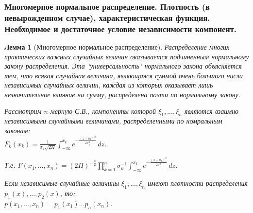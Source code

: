 \documentclass[14pt]{extarticle}
\theoremstyle{breakstyle}
\newtheorem{lemma}{Лемма}[subsection]
\begin{document}
\subsubsection{Многомерное нормальное распределение. Плотность (в невырожденном случае), характеристическая функция. Необходимое и достаточное условие независимости компонент.}
\begin{lemma}[Многомерное нормальное распределение]

Распределение многих практических важных случайных величин оказывается подчиненным нормальному закону распределения. Эта "универсальность" нормального закона объясняется тем, что всякая случайная величина, являющаяся суммой очень большого числа независимых случайных величин, каждая из которых оказывает лишь незначительное влияние на сумму, распределена почти по нормальному закону.

\vspace{\baselineskip}

Рассмотрим $n$-мерную С.В., компоненты которой $\xi_{1}, ..., \xi_{n}$ являются взаимно независимыми случайными величинами, распределенными по номральным законам:\\
$F_{k}(x_{k}) = \frac{1}{\sigma_{k}\sqrt{2\Pi}} \int_{-\infty}^{x_{k}} e^{-\frac{(z-a_{k})^{2}}{2\sigma_{k}^{2}}} \, dz$. 

\vspace{\baselineskip}

Т.е. $F(x_{1}, ..., x_{n}) = (2\Pi)^{-\frac{n}{2}}\prod_{k=1}^{n} \sigma_{k}^{-1} \int_{-\infty}^{x_{k}} e^{-\frac{(z - a_{k})^{2}}{2\sigma_{k}^2}} \, dz$.

\vspace{\baselineskip}

Если независимые случайные величины $\xi_{1}, ..., \xi_{n}$ имеют плотности распределения $p_{1}(x), ..., p_{2}(x)$, то:\\
$p(x_{1}, ..., x_{n}) = p_{1}(x_{1})...p_{n}(x_{n})$.

\end{lemma}
\end{document}
